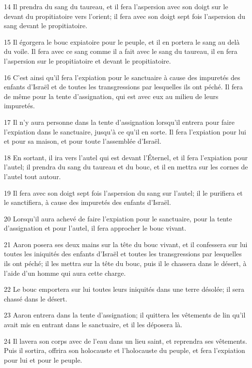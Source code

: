 \par 14 Il prendra du sang du taureau, et il fera l'aspersion avec son doigt sur le devant du propitiatoire vers l'orient; il fera avec son doigt sept fois l'aspersion du sang devant le propitiatoire.
\par 15 Il égorgera le bouc expiatoire pour le peuple, et il en portera le sang au delà du voile. Il fera avec ce sang comme il a fait avec le sang du taureau, il en fera l'aspersion sur le propitiatoire et devant le propitiatoire.
\par 16 C'est ainsi qu'il fera l'expiation pour le sanctuaire à cause des impuretés des enfants d'Israël et de toutes les transgressions par lesquelles ils ont péché. Il fera de même pour la tente d'assignation, qui est avec eux au milieu de leurs impuretés.
\par 17 Il n'y aura personne dans la tente d'assignation lorsqu'il entrera pour faire l'expiation dans le sanctuaire, jusqu'à ce qu'il en sorte. Il fera l'expiation pour lui et pour sa maison, et pour toute l'assemblée d'Israël.
\par 18 En sortant, il ira vers l'autel qui est devant l'Éternel, et il fera l'expiation pour l'autel; il prendra du sang du taureau et du bouc, et il en mettra sur les cornes de l'autel tout autour.
\par 19 Il fera avec son doigt sept fois l'aspersion du sang sur l'autel; il le purifiera et le sanctifiera, à cause des impuretés des enfants d'Israël.
\par 20 Lorsqu'il aura achevé de faire l'expiation pour le sanctuaire, pour la tente d'assignation et pour l'autel, il fera approcher le bouc vivant.
\par 21 Aaron posera ses deux mains sur la tête du bouc vivant, et il confessera sur lui toutes les iniquités des enfants d'Israël et toutes les transgressions par lesquelles ils ont péché; il les mettra sur la tête du bouc, puis il le chassera dans le désert, à l'aide d'un homme qui aura cette charge.
\par 22 Le bouc emportera sur lui toutes leurs iniquités dans une terre désolée; il sera chassé dans le désert.
\par 23 Aaron entrera dans la tente d'assignation; il quittera les vêtements de lin qu'il avait mis en entrant dans le sanctuaire, et il les déposera là.
\par 24 Il lavera son corps avec de l'eau dans un lieu saint, et reprendra ses vêtements. Puis il sortira, offrira son holocauste et l'holocauste du peuple, et fera l'expiation pour lui et pour le peuple.
